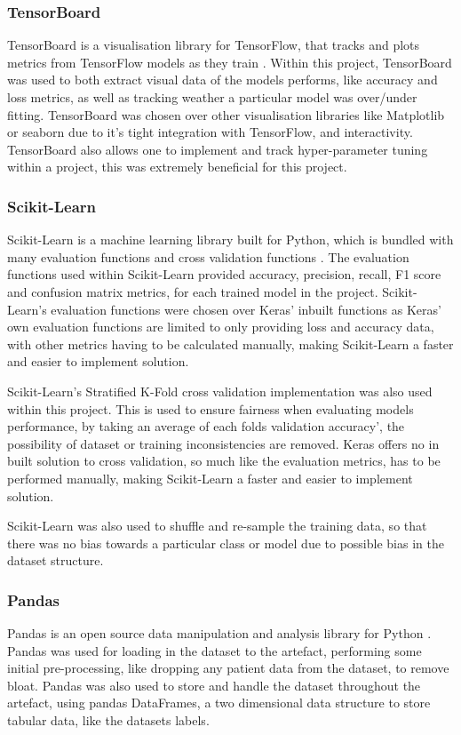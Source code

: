 \subsubsection{TensorBoard}
TensorBoard is a visualisation library for TensorFlow, that tracks and plots metrics from TensorFlow models as they train \citep{TensorBo28:online}. Within this project, TensorBoard was used to both extract visual data of the models performs, like accuracy and loss metrics, as well as tracking weather a particular model was over/under fitting. TensorBoard was chosen over other visualisation libraries like Matplotlib or seaborn due to it's tight integration with TensorFlow, and interactivity. TensorBoard also allows one to implement and track hyper-parameter tuning within a project, this was extremely beneficial for this project.

\subsubsection{Scikit-Learn}
Scikit-Learn is a machine learning library built for Python, which is bundled with many evaluation functions \citep{33Metric9:online} and cross validation functions \citep{31Crossv34:online}. The evaluation functions used within Scikit-Learn provided accuracy, precision, recall, F1 score and confusion matrix metrics, for each trained model in the project. Scikit-Learn's evaluation functions were chosen over Keras' inbuilt functions as Keras' own evaluation functions are limited to only providing loss and accuracy data\citep{Modeltra48:online}, with other metrics having to be calculated manually, making Scikit-Learn a faster and easier to implement solution. 

Scikit-Learn's Stratified K-Fold \citep{sklearnm1:online} cross validation implementation was also used within this project. This is used to ensure fairness when evaluating models performance, by taking an average of each folds validation accuracy', the possibility of dataset or training inconsistencies are removed. Keras offers no in built solution to cross validation, so much like the evaluation metrics, has to be performed manually, making Scikit-Learn a faster and easier to implement solution.

Scikit-Learn was also used to shuffle and re-sample the training data, so that there was no bias towards a particular class or model due to possible bias in the dataset structure.

\subsubsection{Pandas}
Pandas is an open source data manipulation and analysis library for Python \citep{pandasPy63:online}. Pandas was used for loading in the dataset to the artefact, performing some initial pre-processing, like dropping any patient data from the dataset, to remove bloat. Pandas was also used to store and handle the dataset throughout the artefact, using pandas DataFrames, a two dimensional data structure to store tabular data, like the datasets labels.

